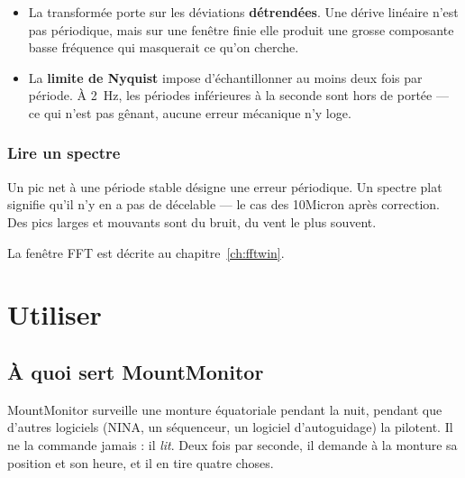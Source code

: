 \begin{itemize}
  \item La transformée porte sur les déviations \textbf{détrendées}. Une dérive
  linéaire n'est pas périodique, mais sur une fenêtre finie elle produit une
  grosse composante basse fréquence qui masquerait ce qu'on cherche.
  \item La \textbf{limite de Nyquist} impose d'échantillonner au moins deux
  fois par période. À 2~Hz, les périodes inférieures à la seconde sont hors de
  portée --- ce qui n'est pas gênant, aucune erreur mécanique n'y loge.
\end{itemize}

\section{Lire un spectre}

Un pic net à une période stable désigne une erreur périodique. Un spectre plat
signifie qu'il n'y en a pas de décelable --- le cas des 10Micron après
correction. Des pics larges et mouvants sont du bruit, du vent le plus souvent.

La fenêtre FFT est décrite au chapitre~\ref{ch:fftwin}.

\part{Utiliser}

\chapter{À quoi sert MountMonitor}
\label{ch:purpose}

MountMonitor surveille une monture équatoriale pendant la nuit, pendant que
d'autres logiciels (NINA, un séquenceur, un logiciel d'autoguidage) la
pilotent. Il ne la commande jamais : il \emph{lit}. Deux fois par seconde, il
demande à la monture sa position et son heure, et il en tire quatre choses.

